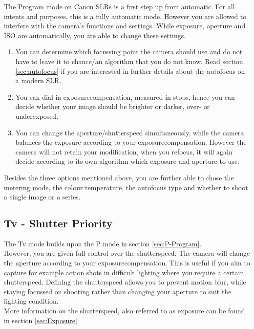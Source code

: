 The Program mode on Canon \glspl{SLR} is a first step up from automatic. For all intents and purposes, this is a fully automatic mode. However you are allowed to interfere with the camera's functions and settings. While \gls{exposure}, \gls{aperture} and \gls{ISO} are automatically, you are able to change these settings.
\\
\begin{enumerate}
	\item You can determine which focussing point the camera should use and do not have to leave it to chance/an algorithm that you do not know. Read section \ref{sec:autofocus} if you are interested in further details about the autofocus on a modern \gls{SLR}.
	
	\item You can dial in \gls{exposurecompensation}, measured in \glspl{stop}, hence you can decide whether your image should be brighter or darker, over- or underexposed.
	
	\item You can change the \gls{aperture}/\gls{shutterspeed} simultaneously, while the camera balances the \gls{exposure} according to your \gls{exposurecompensation}. However the camera will not retain your modification, when you refocus, it will again decide according to its own algorithm which \gls{exposure} and \gls{aperture} to use.
\end{enumerate}

Besides the three options mentioned above, you are further able to chose the metering mode, the colour temperature, the autofocus type and whether to shoot a single image or a series.


\subsection{Tv - Shutter Priority}

The Tv mode builds upon the P mode in section \ref{sec:P-Program}.
\\
However, you are given full control over the \gls{shutterspeed}. The camera will change the \gls{aperture} according to your \gls{exposurecompensation}. This is useful if you aim to capture for example action shots in difficult lighting where you require a certain \gls{shutterspeed}. Defining the \gls{shutterspeed} allows you to prevent motion blur, while staying focussed on shooting rather than changing your aperture to suit the lighting condition.
\\
More information on the \gls{shutterspeed}, also referred to as \gls{exposure} can be found in section \ref{sec:Exposure}


